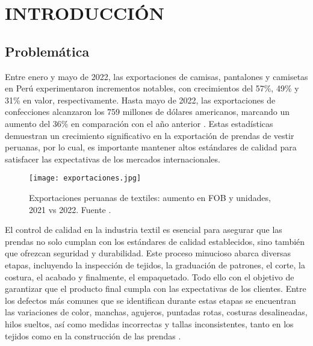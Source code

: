\chapter{\MakeUppercase{Introducción}}
\thispagestyle{mainmatterstyle} %

\section{Problemática} \label{problematic}

Entre enero y mayo de 2022, las exportaciones de camisas, pantalones y camisetas en Perú experimentaron incrementos notables, con crecimientos del 57\%, 49\% y 31\% en valor, respectivamente. Hasta mayo de 2022, las exportaciones de confecciones alcanzaron los 759 millones de dólares americanos, marcando un aumento del 36\% en comparación con el año anterior \cite{LaCamara2022}. Estas estadísticas demuestran un crecimiento significativo en la exportación de prendas de vestir peruanas, por lo cual, es importante mantener altos estándares de calidad para satisfacer las expectativas de los mercados internacionales.

\begin{figure}[H]
	\centering
	\texttt{[image: exportaciones.jpg]}
	\caption[Exportaciones peruanas de textiles: aumento en FOB y unidades, 2021 vs 2022.]{Exportaciones peruanas de textiles: aumento en FOB y unidades, 2021 vs 2022. Fuente \cite{LaCamara2022}.}
\end{figure}

El control de calidad en la industria textil es esencial para asegurar que las prendas no solo cumplan con los estándares de calidad establecidos, sino también que ofrezcan seguridad y durabilidad. Este proceso minucioso abarca diversas etapas, incluyendo la inspección de tejidos, la graduación de patrones, el corte, la costura, el acabado y finalmente, el empaquetado. Todo ello con el objetivo de garantizar que el producto final cumpla con las expectativas de los clientes. Entre los defectos más comunes que se identifican durante estas etapas se encuentran las variaciones de color, manchas, agujeros, puntadas rotas, costuras desalineadas, hilos sueltos, así como medidas incorrectas y tallas inconsistentes, tanto en los tejidos como en la construcción de las prendas \cite{TetraInspection2024}. 

